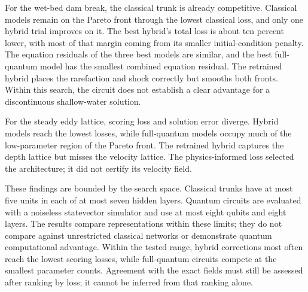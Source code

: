 \documentclass{erdc}
\begin{document}
For the wet-bed dam break, the classical trunk is already competitive. Classical models remain on the Pareto front through the lowest classical loss, and only one hybrid trial improves on it. The best hybrid’s total loss is about ten percent lower, with most of that margin coming from its smaller initial-condition penalty. The equation residuals of the three best models are similar, and the best full-quantum model has the smallest combined equation residual. The retrained hybrid places the rarefaction and shock correctly but smooths both fronts. Within this search, the circuit does not establish a clear advantage for a discontinuous shallow-water solution.

For the steady eddy lattice, scoring loss and solution error diverge. Hybrid models reach the lowest losses, while full-quantum models occupy much of the low-parameter region of the Pareto front. The retrained hybrid captures the depth lattice but misses the velocity lattice. The physics-informed loss selected the architecture; it did not certify its velocity field.

These findings are bounded by the search space. Classical trunks have at most five units in each of at most seven hidden layers. Quantum circuits are evaluated with a noiseless statevector simulator and use at most eight qubits and eight layers. The results compare representations within these limits; they do not compare against unrestricted classical networks or demonstrate quantum computational advantage. Within the tested range, hybrid corrections most often reach the lowest scoring losses, while full-quantum circuits compete at the smallest parameter counts. Agreement with the exact fields must still be assessed after ranking by loss; it cannot be inferred from that ranking alone.



\end{document}
